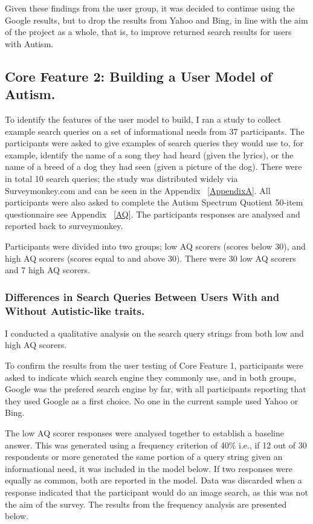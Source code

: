 \documentclass[a4paper, 11pt]{article}
\begin{document}
\vspace{5mm}
Given these findings from the user group, it was decided to continue using the Google results, but to drop the results from Yahoo and Bing, in line with the aim of the project as a whole, that is, to improve returned search results for users with Autism.



\subsection{Core Feature 2: Building a User Model of Autism.}
To identify the features of the user model to build, I ran a study to collect example search queries on a set of informational needs from 37 participants. The participants were asked to give examples of search queries they would use to, for example, identify the name of a song they had heard (given the lyrics), or the name of a breed of a dog they had seen (given a picture of the dog). There were in total 10 search queries; the study was distributed widely via Surveymonkey.com \cite{surveymonkey} and can be seen in the Appendix ~\ref{AppendixA}. All participants were also asked to complete the Autism Spectrum Quotient 50-item questionnaire see Appendix ~\ref{AQ}. The participants responses are analysed and reported back to surveymonkey.


\vspace{5mm}
Participants were divided into two groups; low AQ scorers (scores below 30), and high AQ scorers (scores equal to and above 30). There were 30 low AQ scorers and 7 high AQ scorers. 


\subsubsection{Differences in Search Queries Between Users With and Without Autistic-like traits.}
I conducted a qualitative analysis on the search query strings from both low and high AQ scorers.

\vspace{5mm}
To confirm the results from the user testing of Core Feature 1, participants were asked to indicate which search engine they commonly use, and in both groups, Google was the prefered search engine by far, with all participants reporting that they used Google as a first choice. No one in the current sample used Yahoo or Bing.

\vspace{5mm} 
The low AQ scorer responses were analysed together to establish a baseline answer. This was generated using a frequency criterion of 40\% i.e., if 12 out of 30 respondents or more generated the same portion of a query string given an informational need, it was included in the model below. If two responses were equally as common, both are reported in the model. Data was discarded when a response indicated that the participant would do an image search, as this was not the aim of the survey. The results from the frequency analysis are presented below.
\end{document}
